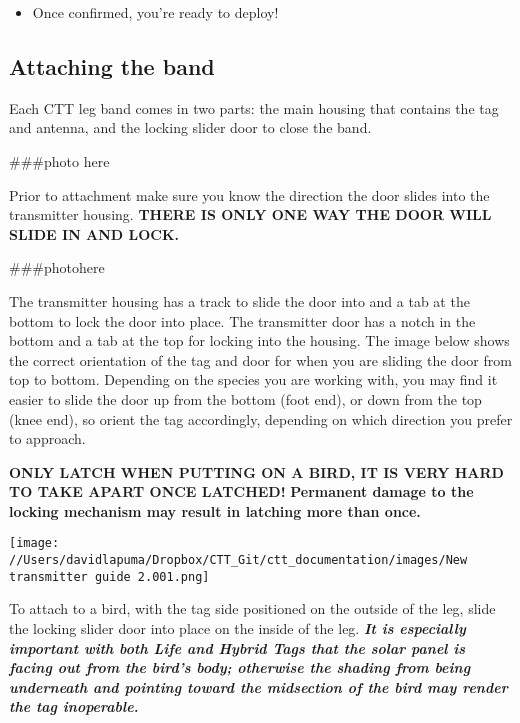 \documentclass[
]{article}
\providecommand{\tightlist}{%
  \setlength{\itemsep}{0pt}\setlength{\parskip}{0pt}}
\begin{document}
\begin{itemize}
\begin{itemize}
\begin{itemize}
      \begin{itemize}
      \tightlist
      \item
        Once confirmed, you're ready to deploy!
      \end{itemize}
    \end{itemize}
  \end{itemize}
\end{itemize}

\hypertarget{attaching-the-band}{%
\subsection{Attaching the band}\label{attaching-the-band}}

Each CTT leg band comes in two parts: the main housing that contains the
tag and antenna, and the locking slider door to close the band.

\#\#\#photo here

Prior to attachment make sure you know the direction the door slides
into the transmitter housing. \textbf{THERE IS ONLY ONE WAY THE DOOR
WILL SLIDE IN AND LOCK.}

\#\#\#photohere

The transmitter housing has a track to slide the door into and a tab at
the bottom to lock the door into place. The transmitter door has a notch
in the bottom and a tab at the top for locking into the housing. The
image below shows the correct orientation of the tag and door for when
you are sliding the door from top to bottom. Depending on the species
you are working with, you may find it easier to slide the door up from
the bottom (foot end), or down from the top (knee end), so orient the
tag accordingly, depending on which direction you prefer to approach.

\textbf{ONLY LATCH WHEN PUTTING ON A BIRD, IT IS VERY HARD TO TAKE APART
ONCE LATCHED!} \textbf{Permanent damage to the locking mechanism may
result in latching more than once.}

\texttt{[image: //Users/davidlapuma/Dropbox/CTT\_Git/ctt\_documentation/images/New transmitter guide 2.001.png]}

To attach to a bird, with the tag side positioned on the outside of the
leg, slide the locking slider door into place on the inside of the leg.
\textbf{\emph{It is especially important with both Life and Hybrid Tags
that the solar panel is facing out from the bird's body; otherwise the
shading from being underneath and pointing toward the midsection of the
bird may render the tag inoperable.}}
\end{document}
